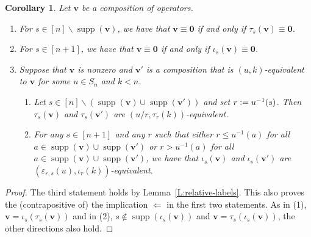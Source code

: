 \documentclass[11pt]{article}
\newtheorem{corollary}[theo]{Corollary}
\theoremstyle{definition}
\numberwithin{equation}{section}
\newcommand{\qv}{{\mathbf v}}
\newcommand{\bzero}{{\mathbf 0}}
\DeclareMathOperator{\supp}{supp}
\begin{document}
\begin{corollary}\label{C:single_equivalences}
  Let $\qv$ be a composition of operators.
  \begin{enumerate}[label=(\arabic*)]
    
  \item \label{C:SE_1}
    For $s\in[n]\smallsetminus\supp(\qv)$, we have that $\qv\equiv\bzero$ if and only if $\tau_s(\qv)\equiv\bzero$.

  \item
    For $s\in[n{+}1]$, we have that $\qv\equiv\bzero$ if and only if $\iota_s(\qv)\equiv\bzero$.

  \item  \label{C:SE_3}
    Suppose that $\qv$ is nonzero and $\qv'$ is a composition that is $(u,k)$-equivalent to $\qv$ for some $u\in S_n$ and $k<n$. 
    
        \begin{enumerate}[label=(\roman*)]
        \item  \label{C:SE_3_i}
          Let $s\in[n]\smallsetminus(\supp(\qv)\cup\supp(\qv'))$ and set $r\vcentcolon= u^{-1}(s)$.
          Then $\tau_s(\qv)$ and $\tau_s(\qv')$ are $(u/r,\tau_r(k))$-equivalent.

        \item
          For any $s\in[n{+}1]$ and any $r$ such that either $r\leq u^{-1}(a)$ for all $a\in\supp(\qv)\cup\supp(\qv')$ or
          $r>u^{-1}(a)$ for all $a\in\supp(\qv)\cup\supp(\qv')$, we have that 
          $\iota_s(\qv)$ and $\iota_s(\qv')$ are $(\varepsilon_{r,s}(u), \iota_r(k))$-equivalent.

        \end{enumerate}   
  \end{enumerate}
\end{corollary}

\begin{proof}
  The third statement holds by Lemma~\ref{L:relative-labels}.
  This also proves the (contrapositive of) the implication $\Leftarrow$ in the first two statements.
  As in (1), $\qv=\iota_s(\tau_s(\qv))$ and in (2), $s\not\in\supp(\iota_s(\qv))$ and $\qv=\tau_s(\iota_s(\qv))$, the other
  directions also hold.  
\end{proof}
\end{document}
